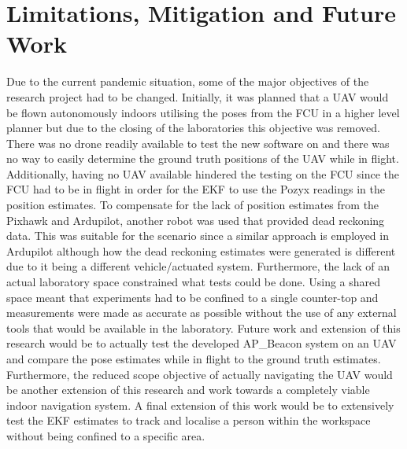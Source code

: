 \section{Limitations, Mitigation and Future Work}\label{sec:limitations,-mitigations-and-future-work}
Due to the current pandemic situation, some of the major objectives of the research project had to be changed.
Initially, it was planned that a UAV would be flown autonomously indoors utilising the poses from the FCU in a higher level planner but due to the closing of the laboratories this objective was removed.
There was no drone readily available to test the new software on and there was no way to easily determine the ground truth positions of the UAV while in flight.
Additionally, having no UAV available hindered the testing on the FCU since the FCU had to be in flight in order for the EKF to use the Pozyx readings in the position estimates.
To compensate for the lack of position estimates from the Pixhawk and Ardupilot, another robot was used that provided dead reckoning data.
This was suitable for the scenario since a similar approach is employed in Ardupilot although how the dead reckoning estimates were generated is different due to it being a different vehicle/actuated system.
Furthermore, the lack of an actual laboratory space constrained what tests could be done.
Using a shared space meant that experiments had to be confined to a single counter-top and measurements were made as accurate as possible without the use of any external tools that would be available in the laboratory.
Future work and extension of this research would be to actually test the developed AP\_Beacon system on an UAV and compare the pose estimates while in flight to the ground truth estimates.
Furthermore, the reduced scope objective of actually navigating the UAV would be another extension of this research and work towards a completely viable indoor navigation system.
A final extension of this work would be to extensively test the EKF estimates to track and localise a person within the workspace without being confined to a specific area.

